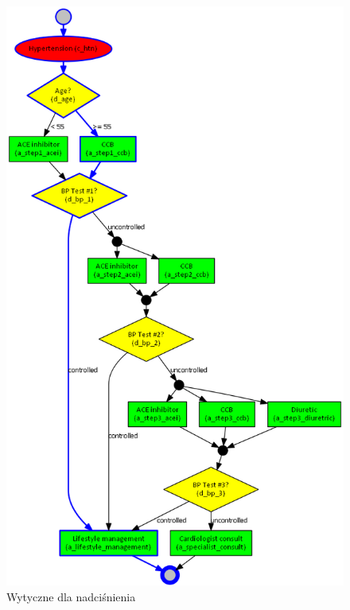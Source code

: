 \begin{figure}[H]
\centering
\includegraphics[scale=0.45]{img/htn-ver-3.png}
\caption{Wytyczne dla nadciśnienia}
\label{fig:htn}
\end{figure}

